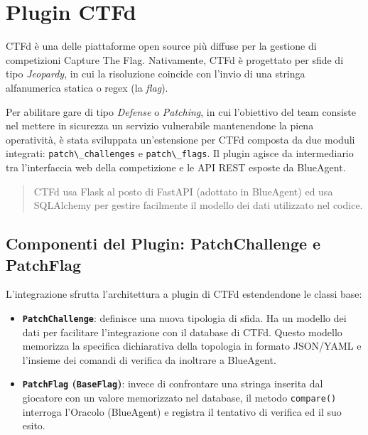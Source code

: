\section{Plugin CTFd}\label{plugin-ctfd}

CTFd è una delle piattaforme open source più diffuse per la gestione di
competizioni Capture The Flag. Nativamente, CTFd è progettato per sfide
di tipo \emph{Jeopardy}, in cui la risoluzione coincide con l'invio di
una stringa alfanumerica statica o regex (la \emph{flag}).

Per abilitare gare di tipo \emph{Defense} o \emph{Patching}, in cui
l'obiettivo del team consiste nel mettere in sicurezza un servizio
vulnerabile mantenendone la piena operatività, è stata sviluppata
un'estensione per CTFd composta da due moduli integrati:
\passthrough{\lstinline!patch\_challenges!} e
\passthrough{\lstinline!patch\_flags!}. Il plugin agisce da
intermediario tra l'interfaccia web della competizione e le API REST
esposte da BlueAgent.

\begin{quote}
CTFd usa Flask al posto di FastAPI (adottato in BlueAgent) ed usa
SQLAlchemy per gestire facilmente il modello dei dati utilizzato nel
codice.
\end{quote}

\subsection{Componenti del Plugin: PatchChallenge e
PatchFlag}\label{componenti-del-plugin-patchchallenge-e-patchflag}

L'integrazione sfrutta l'architettura a plugin di CTFd estendendone le
classi base:

\begin{itemize}
\tightlist
\item
  \textbf{\passthrough{\lstinline!PatchChallenge!}}: definisce una nuova
  tipologia di sfida. Ha un modello dei dati per facilitare
  l'integrazione con il database di CTFd. Questo modello memorizza la
  specifica dichiarativa della topologia in formato JSON/YAML e
  l'insieme dei comandi di verifica da inoltrare a BlueAgent.
\item
  \textbf{\passthrough{\lstinline!PatchFlag!}
  (\passthrough{\lstinline!BaseFlag!})}: invece di confrontare una
  stringa inserita dal giocatore con un valore memorizzato nel database,
  il metodo \passthrough{\lstinline!compare()!} interroga l'Oracolo
  (BlueAgent) e registra il tentativo di verifica ed il suo esito.
\end{itemize}

